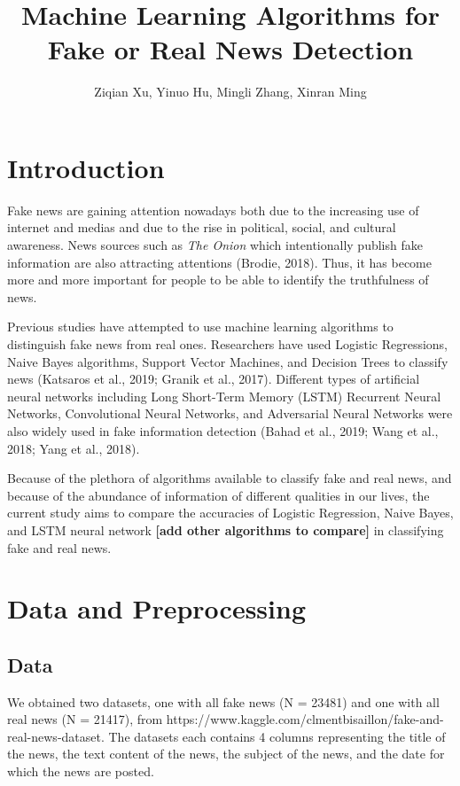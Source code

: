 \documentclass{article}
\title{Machine Learning Algorithms for Fake or Real News Detection}
\author{Ziqian Xu, Yinuo Hu, Mingli Zhang, Xinran Ming}
\date{}
\begin{document}
\maketitle


\begin{multicols}{2}
\section{Introduction}

Fake news are gaining attention nowadays both due to the increasing use of internet and medias and due to the rise in political, social, and cultural awareness. News sources such as \emph{The Onion} which intentionally publish fake information are also attracting attentions (Brodie, 2018). Thus, it has become more and more important for people to be able to identify the truthfulness of news.\par
Previous studies have attempted to use machine learning algorithms to distinguish fake news from real ones. Researchers have used Logistic Regressions, Naive Bayes algorithms, Support Vector Machines, and Decision Trees to classify news (Katsaros et al., 2019; Granik et al., 2017). Different types of artificial neural networks including Long Short-Term Memory (LSTM) Recurrent Neural Networks, Convolutional Neural Networks, and Adversarial Neural Networks were also widely used in fake information detection (Bahad et al., 2019; Wang et al., 2018; Yang et al., 2018). \par
Because of the plethora of algorithms available to classify fake and real news, and because of the abundance of information of different qualities in our lives, the current study aims to compare the accuracies of Logistic Regression, Naive Bayes, and LSTM neural network \textbf{[add other algorithms to compare]} in classifying fake and real news. 


\section{Data and Preprocessing}

\subsection{Data}
We obtained two datasets, one with all fake news (N = 23481) and one with all real news (N = 21417), from https://www.kaggle.com/clmentbisaillon/fake-and-real-news-dataset. The datasets each contains 4 columns representing the title of the news, the text content of the news, the subject of the news, and the date for which the news are posted. 


\end{multicols}
\end{document}
